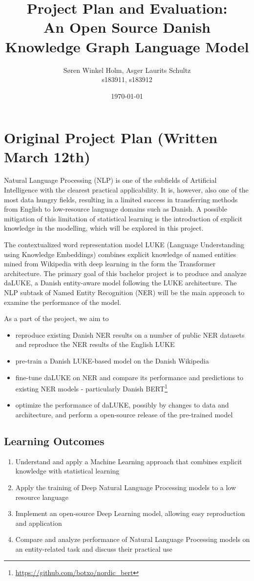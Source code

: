 \documentclass[12pt,fleqn]{article}
\title{
    Project Plan and Evaluation:\\
    An Open Source Danish Knowledge Graph Language Model
}
\author{Søren Winkel Holm, Asger Laurits Schultz\\s183911, s183912}
\date{\today}
\begin{document}
\maketitle

\section{Original Project Plan (Written March 12th)}
Natural Language Processing (NLP) is one of the subfields of Artificial Intelligence with the clearest practical applicability.
It is, however, also one of the most data hungry fields, resulting in a limited success in transferring methods from English to low-resource language domains such as Danish.
A possible mitigation of this limitation of statistical learning is the introduction of explicit knowledge in the modelling, which will be explored in this project.

The contextualized word representation model LUKE (Language Understanding using Knowledge Embeddings) \cite{luke} combines explicit knowledge of named entities mined from Wikipedia with deep learning in the form the Transformer architecture. \cite{transformer}
The primary goal of this bachelor project is to produce and analyze daLUKE, a Danish entity-aware model following the LUKE architecture.
The NLP subtask of Named Entity Recognition (NER) will be the main approach to examine the performance of the model.

As a part of the project, we aim to
\begin{itemize}
    \item reproduce existing Danish NER results on a number of public NER datasets and reproduce the NER results of the English LUKE
    \item pre-train a Danish LUKE-based model on the Danish Wikipedia
    \item fine-tune daLUKE on NER and compare its performance and predictions to existing NER models - particularly Danish BERT\footnote{\url{https://github.com/botxo/nordic\_bert}}
    \item optimize the performance of daLUKE, possibly by changes to data and architecture, and perform a open-source release of the pre-trained model
\end{itemize}

\subsection*{Learning Outcomes}%
\begin{enumerate}
    \item Understand and apply a Machine Learning approach that combines explicit knowledge with statistical learning
    \item Apply the training of Deep Natural Language Processing models to a low resource language
    \item Implement an open-source Deep Learning model, allowing easy reproduction and application
    \item Compare and analyze performance of Natural Language Processing models on an entity-related task and discuss their practical use
\end{enumerate}
\end{document}
